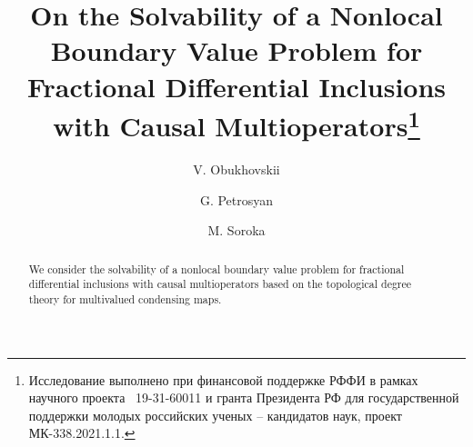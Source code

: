 \begin{englishtitle} %
\title{On the Solvability of a Nonlocal Boundary Value Problem for Fractional Differential Inclusions with Causal Multioperators\thanks{Исследование выполнено при финансовой поддержке РФФИ в рамках научного проекта \textnumero~19-31-60011 и гранта Президента РФ для государственной поддержки молодых российских ученых – кандидатов наук, проект МК-338.2021.1.1.}}
\author{V. Obukhovskii
  \and
  G. Petrosyan
  \and
  M. Soroka
}

\maketitle

\begin{abstract}
We consider the solvability of a nonlocal boundary value problem for fractional differential inclusions  with causal multioperators based on the topological degree theory for multivalued condensing maps.

\end{abstract}
\end{englishtitle}

\iffalse
%
%


